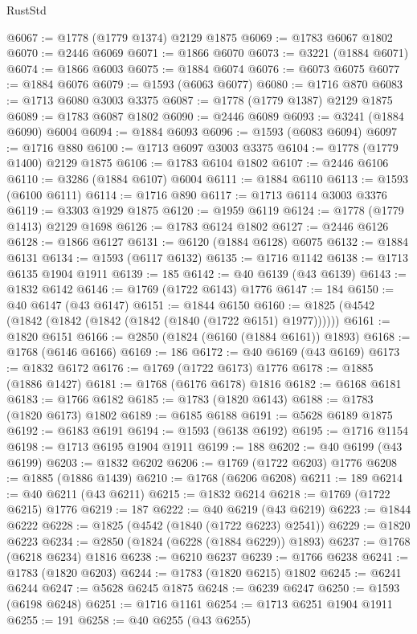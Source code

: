 \begin{lexlean}{RustStd}
\begin{coremodule}
@6067 := @1778 (@1779 @1374) @2129 @1875
@6069 := @1783 @6067 @1802
@6070 := @2446 @6069
@6071 := @1866 @6070
@6073 := @3221 (@1884 @6071)
@6074 := @1866 @6003
@6075 := @1884 @6074
@6076 := @6073 @6075
@6077 := @1884 @6076
@6079 := @1593 (@6063 @6077)
@6080 := @1716 @870
@6083 := @1713 @6080 @3003 @3375
@6087 := @1778 (@1779 @1387) @2129 @1875
@6089 := @1783 @6087 @1802
@6090 := @2446 @6089
@6093 := @3241 (@1884 @6090) @6004
@6094 := @1884 @6093
@6096 := @1593 (@6083 @6094)
@6097 := @1716 @880
@6100 := @1713 @6097 @3003 @3375
@6104 := @1778 (@1779 @1400) @2129 @1875
@6106 := @1783 @6104 @1802
@6107 := @2446 @6106
@6110 := @3286 (@1884 @6107) @6004
@6111 := @1884 @6110
@6113 := @1593 (@6100 @6111)
@6114 := @1716 @890
@6117 := @1713 @6114 @3003 @3376
@6119 := @3303 @1929 @1875
@6120 := @1959 @6119
@6124 := @1778 (@1779 @1413) @2129 @1698
@6126 := @1783 @6124 @1802
@6127 := @2446 @6126
@6128 := @1866 @6127
@6131 := @6120 (@1884 @6128) @6075
@6132 := @1884 @6131
@6134 := @1593 (@6117 @6132)
@6135 := @1716 @1142
@6138 := @1713 @6135 @1904 @1911
@6139 := 185
@6142 := @40 @6139 (@43 @6139)
@6143 := @1832 @6142
@6146 := @1769 (@1722 @6143) @1776
@6147 := 184
@6150 := @40 @6147 (@43 @6147)
@6151 := @1844 @6150
@6160 := @1825 (@4542 (@1842 (@1842 (@1842 (@1842 (@1840 (@1722 @6151) @1977))))))
@6161 := @1820 @6151
@6166 := @2850 (@1824 (@6160 (@1884 @6161)) @1893)
@6168 := @1768 (@6146 @6166)
@6169 := 186
@6172 := @40 @6169 (@43 @6169)
@6173 := @1832 @6172
@6176 := @1769 (@1722 @6173) @1776
@6178 := @1885 (@1886 @1427)
@6181 := @1768 (@6176 @6178) @1816
@6182 := @6168 @6181
@6183 := @1766 @6182
@6185 := @1783 (@1820 @6143)
@6188 := @1783 (@1820 @6173) @1802
@6189 := @6185 @6188
@6191 := @5628 @6189 @1875
@6192 := @6183 @6191
@6194 := @1593 (@6138 @6192)
@6195 := @1716 @1154
@6198 := @1713 @6195 @1904 @1911
@6199 := 188
@6202 := @40 @6199 (@43 @6199)
@6203 := @1832 @6202
@6206 := @1769 (@1722 @6203) @1776
@6208 := @1885 (@1886 @1439)
@6210 := @1768 (@6206 @6208)
@6211 := 189
@6214 := @40 @6211 (@43 @6211)
@6215 := @1832 @6214
@6218 := @1769 (@1722 @6215) @1776
@6219 := 187
@6222 := @40 @6219 (@43 @6219)
@6223 := @1844 @6222
@6228 := @1825 (@4542 (@1840 (@1722 @6223) @2541))
@6229 := @1820 @6223
@6234 := @2850 (@1824 (@6228 (@1884 @6229)) @1893)
@6237 := @1768 (@6218 @6234) @1816
@6238 := @6210 @6237
@6239 := @1766 @6238
@6241 := @1783 (@1820 @6203)
@6244 := @1783 (@1820 @6215) @1802
@6245 := @6241 @6244
@6247 := @5628 @6245 @1875
@6248 := @6239 @6247
@6250 := @1593 (@6198 @6248)
@6251 := @1716 @1161
@6254 := @1713 @6251 @1904 @1911
@6255 := 191
@6258 := @40 @6255 (@43 @6255)

\end{coremodule}
\end{lexlean}
